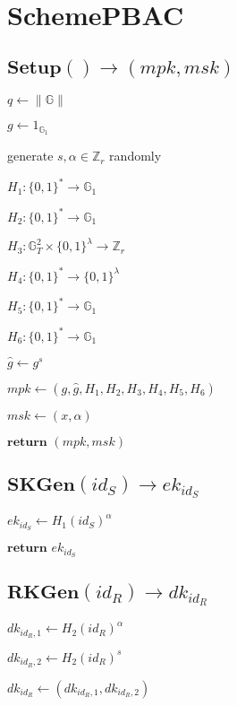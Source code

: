 \documentclass[a4paper]{article}
\begin{document}
\section{SchemePBAC}

\subsection{$\textbf{Setup}() \rightarrow (\textit{mpk}, \textit{msk})$}

$q \gets \|\mathbb{G}\|$

$g \gets 1_{\mathbb{G}_1}$

generate $s, \alpha \in \mathbb{Z}_r$ randomly

$H_1: \{0, 1\}^* \rightarrow \mathbb{G}_1$

$H_2: \{0, 1\}^* \rightarrow \mathbb{G}_1$

$H_3: \mathbb{G}_T^2 \times \{0, 1\}^\lambda \rightarrow \mathbb{Z}_r$

$H_4: \{0, 1\}^* \rightarrow \{0, 1\}^\lambda$

$H_5: \{0, 1\}^* \rightarrow \mathbb{G}_1$

$H_6: \{0, 1\}^* \rightarrow \mathbb{G}_1$

$\hat{g} \gets g^s$

$ \textit{mpk} \gets (g, \hat{g}, H_1, H_2, H_3, H_4, H_5, H_6)$

$\textit{msk} \gets (x, \alpha)$

$\textbf{return }(\textit{mpk}, \textit{msk})$

\subsection{$\textbf{SKGen}(\textit{id}_S) \rightarrow \textit{ek}_{\textit{id}_S}$}

$\textit{ek}_{\textit{id}_S} \gets H_1(\textit{id}_S)^\alpha$

$\textbf{return }\textit{ek}_{\textit{id}_S}$

\subsection{$\textbf{RKGen}(\textit{id}_R) \rightarrow \textit{dk}_{\textit{id}_R}$}

$\textit{dk}_{\textit{id}_R, 1} \gets H_2(\textit{id}_R)^\alpha$

$\textit{dk}_{\textit{id}_R, 2} \gets H_2(\textit{id}_R)^s$

$\textit{dk}_{\textit{id}_R} \gets (\textit{dk}_{\textit{id}_R, 1}, \textit{dk}_{\textit{id}_R, 2})$
\end{document}
